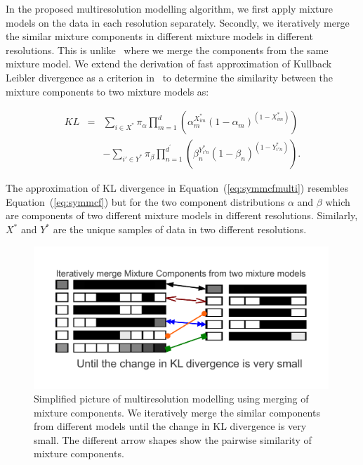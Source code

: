 In the proposed multiresolution modelling 
algorithm, we first apply mixture models on the data in each 
resolution separately. Secondly, we 
iteratively merge the similar mixture components in different 
mixture models in different resolutions. This is unlike~
where we merge the components from the same mixture model. We 
extend the derivation of fast approximation of Kullback Leibler
divergence as a criterion in~ to determine the  
similarity between the mixture components to two mixture 
models as:

\begin{eqnarray}
\label{eq:symmcfmulti}
KL & = & \displaystyle \sum_{i \in X^{*}} \pi_{\alpha} \displaystyle
\prod _{m=1}^{{d}}
\left(\alpha_m^{X^{*}_{im}}(1-\alpha_{m})^{(1-X^{*}_{im})} \right) \\ \nonumber
& &- \displaystyle \sum_{i{\prime} \in Y^{*}} \pi_{\beta} \displaystyle \prod
_{n=1}^{{d^{\prime}}} \left(
\beta_{n}^{Y^{*}_{i{\prime}n}}(1-\beta_{n})^{(1-Y^{*}_{i{\prime}n})} \right).
\end{eqnarray}

The approximation of KL divergence in Equation~(\ref{eq:symmcfmulti}) 
resembles Equation~(\ref{eq:symmcf}) but for the two component 
distributions $\alpha$ and $\beta$ which are components of two different
mixture models in different resolutions. Similarly, $X^{*}$
and $Y^{*}$ are the unique samples of data in two different 
resolutions.

\begin{figure}[h!]
\centering
\includegraphics[trim=10mm 10mm 20mm 2mm,width=0.99\textwidth]{figures/idasecondpage}
\caption[Merging of Similar Mixture Components.]
{Simplified picture of multiresolution modelling using merging of mixture
components. We iteratively merge the similar components from different 
models until the change in KL divergence is very small. The different
arrow shapes show the pairwise similarity of mixture components.} 
\label{Fig:idasecondpage}
\end{figure}

